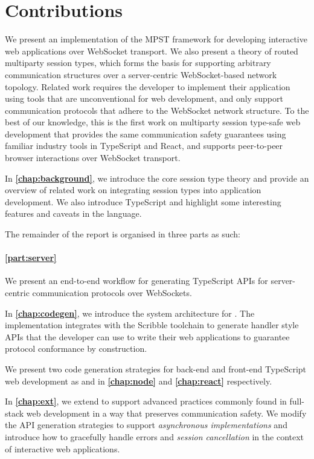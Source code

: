 \section{Contributions}

We present an implementation of the MPST framework for developing
interactive web applications over WebSocket transport.
We also present a theory of routed multiparty session types,
which forms the basis for supporting arbitrary communication structures
over a server-centric WebSocket-based network topology.
Related work \citep{PureScript2019, MVU2020, LINKS, Exceptional} 
requires the 
developer to implement their application using tools that are 
unconventional for web development, 
and only support communication protocols that adhere to the
WebSocket network structure.
To the best of our knowledge, this is the first work on multiparty session
type-safe web development that provides the same communication safety 
guarantees using familiar industry tools in TypeScript and React,
and supports peer-to-peer browser interactions over WebSocket transport.

In \textbf{\cref{chap:background}}, 
we introduce the core session type theory
and provide an overview of related work on integrating session types into
application development. We also introduce TypeScript and highlight some 
interesting features and caveats in the language.

The remainder of the report is organised in three parts as such:

\paragraph{\cref{part:server}}
We present an end-to-end workflow for generating TypeScript APIs for 
server-centric communication protocols over WebSockets. 

In \textbf{\cref{chap:codegen}}, 
we introduce the system architecture for
\codegen. 
The implementation integrates with the Scribble
toolchain to generate handler style APIs that the developer can use to write 
their web applications to guarantee protocol conformance by construction.

We present two code generation strategies for back-end and front-end
TypeScript web development as \nodecodegen and \reactcodegen
in \textbf{\cref{chap:node}} and \textbf{\cref{chap:react}} respectively.

In \textbf{\cref{chap:ext}},
we extend \codegen to support advanced
practices commonly found in full-stack web development in a way that
preserves communication safety. 
We modify the API generation strategies
to support \textit{asynchronous implementations} 
and introduce how to 
gracefully handle errors and \textit{session cancellation} 
in the context of interactive web applications.

